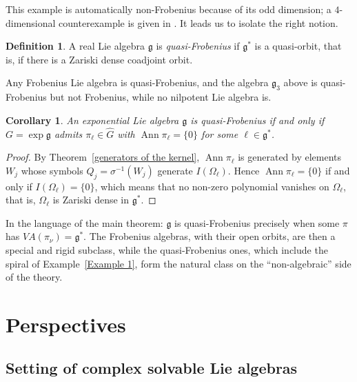\documentclass[11pt]{amsart}
\theoremstyle{plain}
\newtheorem{cor}[thm]{Corollary}
\theoremstyle{definition}
\newtheorem{defn}[thm]{Definition}
\theoremstyle{remark}
\newcommand{\g}{\mathfrak g}
\newcommand{\Ann}{\operatorname{Ann}}
\newcommand{\VA}{V\!A}
\begin{document}
	This example is automatically non-Frobenius because of its odd dimension; a $4$-dimensional counterexample is given in \cite[\S4]{Bak-Ishi}. It leads us to isolate the right notion.
	
	\begin{defn}\label{Quasi-Frobenius}
		A real Lie algebra $\g$ is \emph{quasi-Frobenius} if $\g^*$ is a quasi-orbit, that is, if there is a Zariski dense coadjoint orbit.
	\end{defn}
	
	Any Frobenius Lie algebra is quasi-Frobenius,  and the algebra $\g_3$ above is quasi-Frobenius but not Frobenius, while no nilpotent Lie algebra is.
	
	\begin{cor}\label{quasi-Frobenius characterization}
		An exponential Lie algebra $\g$ is quasi-Frobenius if and only if $G=\exp\g$ admits $\pi_\ell\in\widehat G$ with $\Ann\pi_\ell=\{0\}$ for some $\ell\in\g^*$.
	\end{cor}
	
	\begin{proof}
		By Theorem~\ref{generators of the kernel}, $\Ann\pi_\ell$ is generated by elements $W_j$ whose symbols $Q_j=\sigma^{-1}(W_j)$ generate $I(\Omega_\ell)$. Hence $\Ann\pi_\ell=\{0\}$ if and only if $I(\Omega_\ell)=\{0\}$, which means that no non-zero polynomial vanishes on $\Omega_\ell$, that is, $\Omega_\ell$ is Zariski dense in $\g^*$.
	\end{proof}
	
	In the language of the main theorem: $\g$ is quasi-Frobenius precisely when some $\pi$ has $\VA(\pi_\nu)=\g^*$. The Frobenius algebras, with their open orbits, are then a special and rigid subclass, while the quasi-Frobenius ones, which include the spiral of Example~\ref{Example 1}, form the natural class on the ``non-algebraic'' side of the theory.
	
	\section{Perspectives}\label{sect:persp}
	
	
	\subsection{Setting of complex solvable Lie algebras}
	
\end{document}
